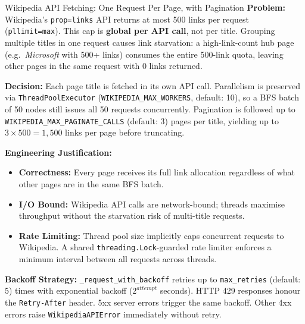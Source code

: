 \documentclass[11pt,a4paper]{article}
\begin{document}
\begin{decisionbox}{Wikipedia API Fetching: One Request Per Page, with Pagination}
\textbf{Problem:} Wikipedia's \texttt{prop=links} API returns at most 500 links per request (\texttt{pllimit=max}). This cap is \textbf{global per API call}, not per title. Grouping multiple titles in one request causes link starvation: a high-link-count hub page (e.g.\ \textit{Microsoft} with 500+ links) consumes the entire 500-link quota, leaving other pages in the same request with 0 links returned.

\textbf{Decision:} Each page title is fetched in its own API call. Parallelism is preserved via \texttt{ThreadPoolExecutor} (\texttt{WIKIPEDIA\_MAX\_WORKERS}, default: 10), so a BFS batch of 50 nodes still issues all 50 requests concurrently. Pagination is followed up to \texttt{WIKIPEDIA\_MAX\_PAGINATE\_CALLS} (default: 3) pages per title, yielding up to $3 \times 500 = 1{,}500$ links per page before truncating.

\textbf{Engineering Justification:}
\begin{itemize}[leftmargin=*, nosep]
    \item \textbf{Correctness:} Every page receives its full link allocation regardless of what other pages are in the same BFS batch.
    \item \textbf{I/O Bound:} Wikipedia API calls are network-bound; threads maximise throughput without the starvation risk of multi-title requests.
    \item \textbf{Rate Limiting:} Thread pool size implicitly caps concurrent requests to Wikipedia. A shared \texttt{threading.Lock}-guarded rate limiter enforces a minimum interval between all requests across threads.
\end{itemize}

\textbf{Backoff Strategy:} \texttt{\_request\_with\_backoff} retries up to \texttt{max\_retries} (default: 5) times with exponential backoff ($2^{attempt}$ seconds). HTTP 429 responses honour the \texttt{Retry-After} header. 5xx server errors trigger the same backoff. Other 4xx errors raise \texttt{WikipediaAPIError} immediately without retry.
\end{decisionbox}
\end{document}
